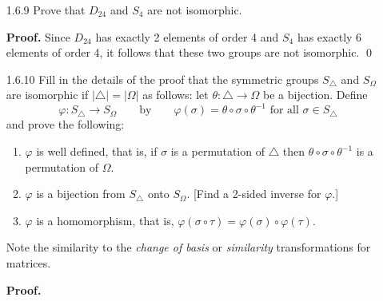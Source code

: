 \begin{enumerate}
      \textbf{Proof.} Let $n$ and $m$ be unequal positive integers so that
      $n! \neq m!$; i.e $n! = |S_n| \neq |S_m| = m!$. Thus no bijective map can
      exist between $S_n$ and $S_m$, so that these two groups are not
      isomorphic. \qed
   \item[1.6.9]   Prove that $D_{24}$ and $S_4$ are not isomorphic.

      \textbf{Proof.} Since $D_{24}$ has exactly 2 elements of order 4 and $S_4$
      has exactly 6 elements of order 4, it follows that these two groups are
      not isomorphic. \qed
   \item[1.6.10]  Fill in the details of the proof that the symmetric groups
                  $S_\triangle$ and $S_\Omega$ are isomorphic if
                  $|\triangle| = |\Omega|$ as follows: let
                  $\theta : \triangle \rightarrow \Omega$ be a bijection. Define
                  $$\varphi : S_\triangle \rightarrow S_\Omega \qquad
                    \text{by} \qquad \varphi(\sigma) = \theta \circ \sigma \circ 
                    \theta^{-1} \text{ for all } \sigma \in S_\triangle$$
                  and prove the following:
                  \begin{enumerate}
                     \item $\varphi$ is well defined, that is, if $\sigma$ is a
                           permutation of $\triangle$ then
                           $\theta\circ\sigma\circ\theta^{-1}$ is a permutation
                           of $\Omega$.
                     \item $\varphi$ is a bijection from $S_\triangle$ onto
                           $S_\Omega$. [Find a 2-sided inverse for $\varphi$.]
                     \item $\varphi$ is a homomorphism, that is,
                           $\varphi(\sigma\circ\tau) =
                            \varphi(\sigma)\circ\varphi(\tau)$.
                  \end{enumerate}
                  Note the similarity to the \textit{change of basis} or
                  \textit{similarity} transformations for matrices.

      \textbf{Proof.}


\end{enumerate}
